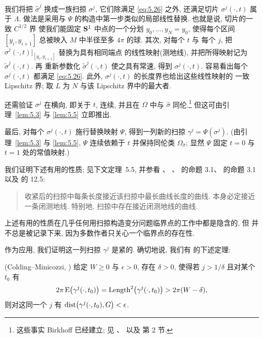 我们将把 $\hat{\sigma}^j$ 换成一族扫掠 $\sigma^j$, 它们除满足 \eqref{eq:5.26}
之外, 还满足切片 $\sigma^j(\cdot,t)$ 属于 $\Lambda$. 做法是采用与 $\Psi$
的构造中第一步类似的局部线性替换. 也就是说, 切片的一致 $C^{1/2}$ 界
使我们能固定 $\mathbf{S}^1$ 中点的一个分划 $y_0,\dots,y_N=y_0$, 使得每个区间
$[y_i,y_{i+1}]$ 总被映入 $M$ 中半径至多 $4\pi$ 的球. 其次, 对每个 $t$ 与
每个 $j$, 把 $\hat{\sigma}^j(\cdot,t)|_{[y_i,y_{i+1}]}$ 替换为具有相同端点
的线性映射(测地线), 并把所得映射记为 $\tilde{\sigma}^j(\cdot,t)$. 再
重新参数化 $\tilde{\sigma}^j(\cdot,t)$ 使之具有常速, 得到
$\sigma^j(\cdot,t)$. 容易看出每个 $\sigma^j(\cdot,t)$ 都满足
\eqref{eq:5.26}. 此外, $\sigma^j(\cdot,t)$ 的长度界也给出这些线性映射的
一致 Lipschitz 界; 取 $L$ 为 $N$ 与该 Lipschitz 界中的最大者.

还需验证 $\sigma^j$ 在横向, 即关于 $t$, 连续, 并且在 $\Omega$ 中与
$\hat{\sigma}$ 同伦.\footnote{这些事实 Birkhoff 已经建立; 见 \cite{B1}、
\cite{B2} 以及 \cite{Cr} 第 2 节.} 但这可由引理~\ref{lem:5.3} 与
\ref{lem:5.5} 立即推出.

最后, 对每个 $\sigma^j(\cdot,t)$ 施行替换映射 $\Psi$, 得到一列新的扫掠
$\gamma^j=\Psi(\sigma^j)$. (由引理~\ref{lem:5.3} 与 \ref{lem:5.5}, $\Psi$
连续依赖于 $t$ 并保持同伦类 $\Omega_{\hat{\sigma}}$; 显然 $\Psi$ 固定
$t=0$ 与 $t=1$ 处的常值映射.)

{\setlength{\emergencystretch}{2em}%
我们证明下述有用的性质; 见下文定理~5.5, 并参看 \cite{CM19}、
\cite{CM27}、\cite{CD} 的命题 3.1、\cite{Pi} 的命题 3.1 以及 \cite{Am3}
的 12.5:\par}

\begin{quote}
收紧后的扫掠中每条长度接近该扫掠中最长曲线长度的曲线, 本身必定接近
一条闭测地线. 特别地, 扫掠中存在接近闭测地线的曲线.
\end{quote}

上述有用的性质在几乎任何用扫掠构造变分问题临界点的工作中都是隐含的, 但
并不总是被记录下来, 因为多数作者只关心一个临界点的存在性.

作为应用, 我们证明这一列扫掠 $\gamma^j$ 是紧的. 确切地说, 我们有
\cite{CM28} 的下述定理:

\begin{theorem}
\label{thm:5.6}
(Colding--Minicozzi, \cite{CM28}) 给定 $W\geq 0$ 与 $\epsilon>0$, 存在
$\delta>0$, 使得若 $j>1/\delta$ 且对某个 $t_0$ 有
\begin{equation}
2\pi\,\mathrm{E}\bigl(\gamma^j(\cdot,t_0)\bigr)
=\operatorname{Length}^2\bigl(\gamma^j(\cdot,t_0)\bigr)>2\pi(W-\delta),
\label{eq:5.28}
\end{equation}
则对这同一个 $j$ 有
$\operatorname{dist}\bigl(\gamma^j(\cdot,t_0),G\bigr)<\epsilon$.
\end{theorem}

